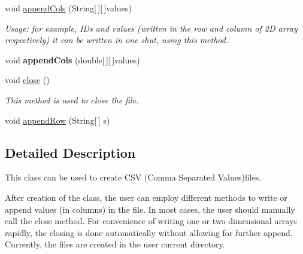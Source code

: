 \begin{DoxyCompactItemize}
\item 
\hypertarget{classuk_1_1ac_1_1dmu_1_1iesd_1_1cascade_1_1io_1_1_c_s_v_writer_a68bfa335c665b694d7500d12bc128ed9}{void \hyperlink{classuk_1_1ac_1_1dmu_1_1iesd_1_1cascade_1_1io_1_1_c_s_v_writer_a68bfa335c665b694d7500d12bc128ed9}{append\-Cols} (String\mbox{[}$\,$\mbox{]}\mbox{[}$\,$\mbox{]}values)}\label{classuk_1_1ac_1_1dmu_1_1iesd_1_1cascade_1_1io_1_1_c_s_v_writer_a68bfa335c665b694d7500d12bc128ed9}

\begin{DoxyCompactList}\small\item\em Usage\-: for example, I\-Ds and values (written in the row and column of 2\-D array respectively) it can be written in one shut, using this method. \end{DoxyCompactList}\item 
\hypertarget{classuk_1_1ac_1_1dmu_1_1iesd_1_1cascade_1_1io_1_1_c_s_v_writer_ae92b8c27d0b0a018daa028d49d1c6d44}{void {\bfseries append\-Cols} (double\mbox{[}$\,$\mbox{]}\mbox{[}$\,$\mbox{]}values)}\label{classuk_1_1ac_1_1dmu_1_1iesd_1_1cascade_1_1io_1_1_c_s_v_writer_ae92b8c27d0b0a018daa028d49d1c6d44}

\item 
void \hyperlink{classuk_1_1ac_1_1dmu_1_1iesd_1_1cascade_1_1io_1_1_c_s_v_writer_a7cc8f9bbe9fe069948824c0e4fd7f75a}{close} ()
\begin{DoxyCompactList}\small\item\em This method is used to close the file. \end{DoxyCompactList}\item 
void \hyperlink{classuk_1_1ac_1_1dmu_1_1iesd_1_1cascade_1_1io_1_1_c_s_v_writer_ab47d667c7f0c48673b3e4a162c16fa12}{append\-Row} (String\mbox{[}$\,$\mbox{]} s)
\end{DoxyCompactItemize}


\subsection{Detailed Description}
This class can be used to create C\-S\-V (Comma Separated Values)files. 

After creation of the class, the user can employ different methods to write or append values (in columns) in the file. In most cases, the user should manually call the close method. For convenience of writing one or two dimensional arrays rapidly, the closing is done automatically without allowing for further append. Currently, the files are created in the user current directory.

